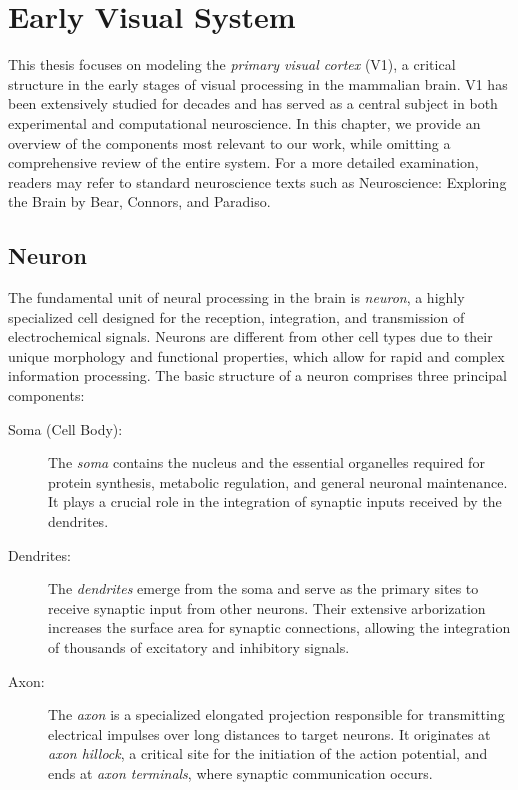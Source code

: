 \chapter{Early Visual System}
\label{chap:visual_system}
This thesis focuses on modeling the \emph{primary visual cortex} (V1), a
critical structure in the early stages of visual processing in the mammalian
brain. V1 has been extensively studied for decades and has served as a central subject
in both experimental and computational neuroscience. In this chapter, we
provide an overview of the components most relevant to our work, while
omitting a comprehensive review of the entire system. For a more detailed
examination, readers may refer to standard neuroscience texts such as
Neuroscience: Exploring the Brain by Bear, Connors, and Paradiso.

\section{Neuron}
\label{sec:neuron}
The fundamental unit of neural processing in the brain is \emph{neuron}, a highly
specialized cell designed for the reception, integration, and transmission of
electrochemical signals. Neurons are different from other cell types due to their
unique morphology and functional properties, which allow for rapid and complex information
processing. The basic structure of a neuron comprises three principal components:

\begin{description}
    \item[Soma (Cell Body):] The \emph{soma} contains the nucleus and the essential organelles required for protein synthesis, metabolic regulation, and general neuronal maintenance. It plays a crucial role in the integration of synaptic inputs received by the dendrites.

    \item[Dendrites:] The \emph{dendrites} emerge from the soma and serve as the primary sites to receive synaptic input from other neurons.
    Their extensive arborization increases the surface area for synaptic connections, allowing the integration of thousands of excitatory and inhibitory signals.

    \item[Axon:] The \emph{axon} is a specialized elongated projection responsible for transmitting electrical impulses over long distances to target neurons. It originates at \emph{axon hillock}, a critical site for the initiation of the action potential, and ends at \emph{axon terminals}, where synaptic communication occurs.
\end{description}

